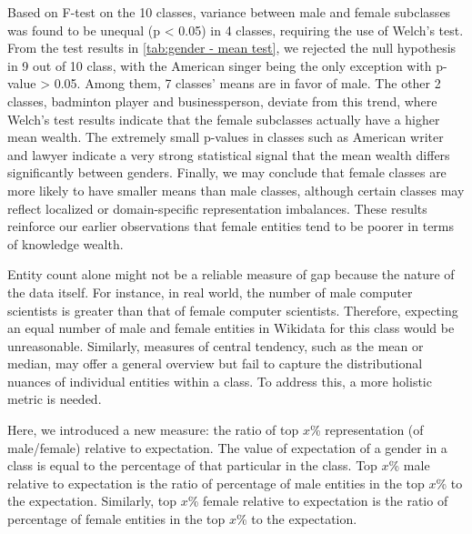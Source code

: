Based on F-test on the 10 classes, variance between male and female subclasses was found to be unequal (p < 0.05) in 4 classes, requiring the use of Welch's test. From the test results in \autoref{tab:gender - mean test}, we rejected the null hypothesis in 9 out of 10 class, with the American singer being the only exception with p-value > 0.05. Among them, 7 classes' means are in favor of male. The other 2 classes, badminton player and businessperson, deviate from this trend, where Welch's test results indicate that the female subclasses actually have a higher mean wealth. The extremely small p-values in classes such as American writer and lawyer indicate a very strong statistical signal that the mean wealth differs significantly between genders. Finally, we may conclude that female classes are more likely to have smaller means than male classes, although certain classes may reflect localized or domain-specific representation imbalances. These results reinforce our earlier observations that female entities tend to be poorer in terms of knowledge wealth.

Entity count alone might not be a reliable measure of gap because the nature of the data itself. For instance, in real world, the number of male computer scientists is greater than that of female computer scientists. Therefore, expecting an equal number of male and female entities in Wikidata for this class would be unreasonable. Similarly, measures of central tendency, such as the mean or median, may offer a general overview but fail to capture the distributional nuances of individual entities within a class. To address this, a more holistic metric is needed.

Here, we introduced a new measure: the ratio of top \(x\)\% representation (of male/female) relative to expectation. The value of expectation of a gender in a class is equal to the percentage of that particular in the class. Top \(x\)\% male relative to expectation is the ratio of percentage of male entities in the top \(x\)\% to the expectation. Similarly, top \(x\)\% female relative to expectation is the ratio of percentage of female entities in the top \(x\)\% to the expectation.

